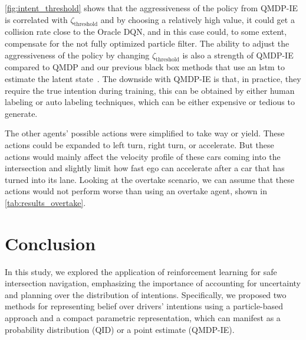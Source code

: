 \ref{fig:intent_threshold} shows that the aggressiveness of the policy from QMDP-IE is correlated with $\zeta_\text{threshold}$ and by choosing a relatively high value, it could get a collision rate close to the Oracle DQN, and in this case could, to some extent, compensate for the not fully optimized particle filter. The ability to adjust the aggressiveness of the policy by changing $\zeta_\text{threshold}$ is also a strength of QMDP-IE compared to QMDP and our previous black box methods that use an \gls{lstm} to estimate the latent state~\cite{Tram2018}. %
The downside with QMDP-IE is that, in practice, they require the true intention during training, this can be obtained by either human labeling or auto labeling techniques, which can be either expensive or tedious to generate. 

The other agents' possible actions were simplified to take way or yield. These actions could be expanded to left turn, right turn, or accelerate. But these actions would mainly affect the velocity profile of these cars coming into the intersection and slightly limit how fast ego can accelerate after a car that has turned into its lane. Looking at the overtake scenario, we can assume that these actions would not perform worse than using an overtake agent, shown in \ref{tab:results_overtake}.

\section{Conclusion}
\label{sec:conclusion}
In this study, we explored the application of reinforcement learning for safe intersection navigation, emphasizing the importance of accounting for uncertainty and planning over the distribution of intentions. Specifically, we proposed two methods for representing belief over drivers' intentions using a particle-based approach and a compact parametric representation, which can manifest as a probability distribution (QID) or a point estimate (QMDP-IE).

